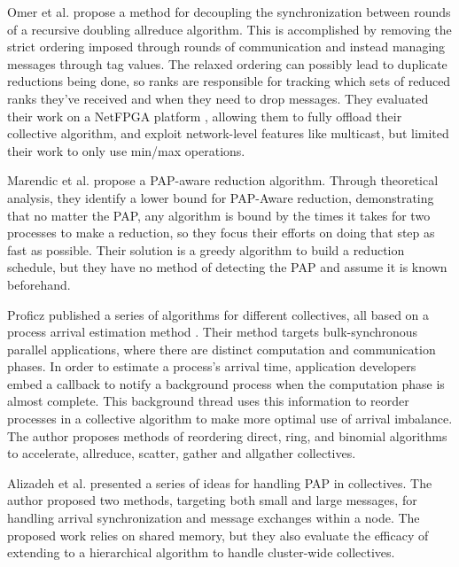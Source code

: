 Omer et al. \cite{Arap2015AdaptiveRDForCC} propose a method for decoupling the synchronization between rounds of a recursive doubling allreduce algorithm. 
This is accomplished by removing the strict ordering imposed through rounds of communication and instead managing messages through tag values.
The relaxed ordering can possibly lead to duplicate reductions being done, so ranks are responsible for tracking which sets of reduced ranks they've received and when they need to drop messages.
They evaluated their work on a NetFPGA platform \cite{Lockwood2007NetFPGA}, allowing them to fully offload their collective algorithm, and exploit network-level features like multicast, but limited their work to only use min/max operations.

Marendic et al. \cite{Marendic2016Clairvoyant} propose a PAP-aware reduction algorithm.
Through theoretical analysis, they identify a lower bound for PAP-Aware reduction, demonstrating that no matter the PAP, any algorithm is bound by the times it takes for two processes to make a reduction, so they focus their efforts on doing that step as fast as possible. 
Their solution is a greedy algorithm to build a reduction schedule, but they have no method of detecting the PAP and assume it is known beforehand.

Proficz published a series of algorithms for different collectives, all based on a process arrival estimation method \cite{Proficz2018ImprvAllReduceForImbPAP, Proficz2020PAPAwareScatterGather, Proficz2021AllGatherResilientToImbPAP}.
Their method targets bulk-synchronous parallel applications, where there are distinct computation and communication phases.
In order to estimate a process's arrival time, application developers embed a callback to notify a background process when the computation phase is almost complete.
This background thread uses this information to reorder processes in a collective algorithm to make more optimal use of arrival imbalance.
The author proposes methods of reordering direct, ring, and binomial algorithms to accelerate, allreduce, scatter, gather and allgather collectives.

Alizadeh et al. \cite{Alizadeh2022PAPCollDL} presented a series of ideas for handling PAP in collectives. 
The author proposed two methods, targeting both small and large messages, for handling arrival synchronization and message exchanges within a node.
The proposed work relies on shared memory, but they also evaluate the efficacy of extending to a hierarchical algorithm to handle cluster-wide collectives.

